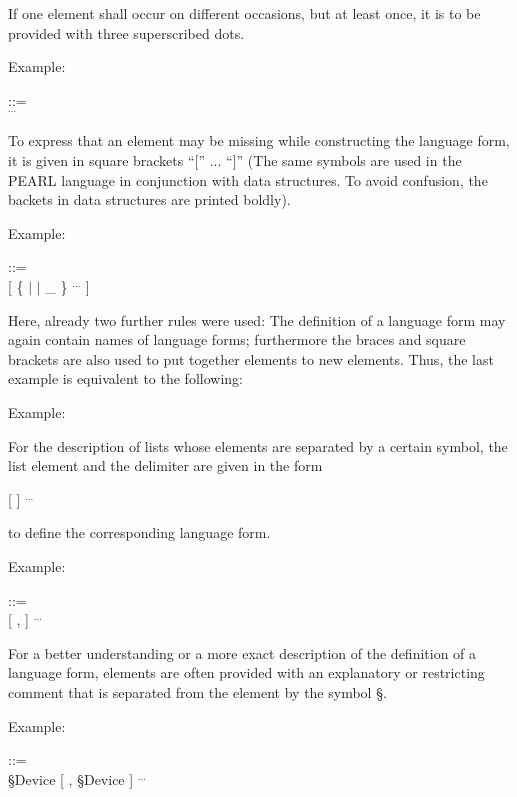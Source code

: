 \begin{grammarframe}


\end{grammarframe}

If one element shall occur on different occasions, but at least once, it
is to be provided with three superscribed dots.

Example:

 ::=\\
\x {} $^{...}$

To express that an element may be missing while constructing the
language form, it is given in square brackets ``['' ... ``]'' (The 
same symbols are used in the PEARL language in conjunction with data structures.
To avoid confusion, the backets in data structures are printed boldly).

Example:

 ::=\\
\x {} [ \{  $\mid$  $\mid$ \_ \} $^{...}$ ]

Here, already two further rules were used: The definition of a language
form may again contain names of language forms; furthermore the braces
and square brackets are also used to put together elements to new
elements. Thus, the last example is equivalent to the following:

Example:

\begin{grammarframe}

\end{grammarframe}


For the description of lists whose elements are separated by a certain
symbol, the list element and the delimiter are given in the form

 [   ] $^{...}$

to define the corresponding language form.

Example:

 ::=\\
\x {} [ ,  ] $^{...}$

For a better understanding or a more exact description of the definition
of a language form, elements are often provided with an explanatory or
restricting comment that is separated from the element by the symbol
\S .

Example:

 ::=\\
\x {}\S  Device [ , \S Device ] $^{...}$

